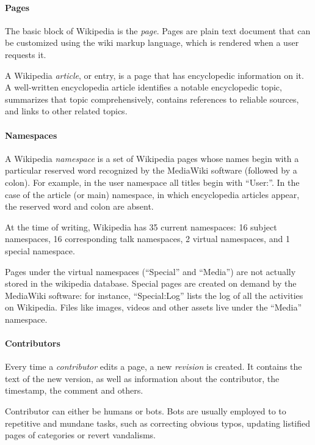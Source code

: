 \paragraph{Pages}
The basic block of Wikipedia is the \emph{page}.
Pages are plain text document that can be customized using the wiki markup language, which is rendered when a user requests it.

A Wikipedia \emph{article}, or entry, is a page that has encyclopedic information on it.
A well-written encyclopedia article identifies a notable encyclopedic topic, summarizes that topic comprehensively, contains references to reliable sources, and links to other related topics.

\paragraph{Namespaces}
A Wikipedia \emph{namespace} is a set of Wikipedia pages whose names begin with a particular reserved word recognized by the MediaWiki software (followed by a colon).
For example, in the user namespace all titles begin with ``User:''.
In the case of the article (or main) namespace, in which encyclopedia articles appear, the reserved word and colon are absent.

At the time of writing, Wikipedia has 35 current namespaces: 16 subject namespaces, 16 corresponding talk namespaces, 2 virtual namespaces, and 1 special namespace.

Pages under the virtual namespaces (``Special'' and ``Media'') are not actually stored in the wikipedia database.
Special pages are created on demand by the MediaWiki software: for instance, ``Special:Log'' lists the log of all the activities on Wikipedia.
Files like images, videos and other assets live under the ``Media'' namespace.

\paragraph{Contributors}
Every time a \emph{contributor} edits a page, a new \emph{revision} is created.
It contains the text of the new version, as well as information about the contributor, the timestamp, the comment and others.

Contributor can either be humans or bots.
Bots are usually employed to to repetitive and mundane tasks, such as correcting obvious typos, updating listified pages of categories or revert vandalisms.

